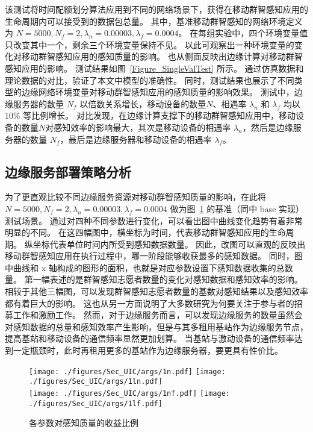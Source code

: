 该测试将时间配额划分算法应用到不同的网络场景下，获得在移动群智感知应用的生命周期内可以接受到的数据包总量。
其中，基准移动群智感知的网络环境定义为 $N=5000, N_f=2, \lambda_n = 0.00003, \lambda_f=0.0004$。
在每组实验中，四个环境变量值只改变其中一个，剩余三个环境变量保持不见。
以此可观察出一种环境变量的变化对移动群智感知应用的感知质量的影响。
也从侧面反映出边缘计算对移动群智感知应用的影响。
测试结果如图~\ref{Figure_SingleValTest} 所示。
通过仿真数据和理论数据的对比，验证了本文中模型的准确性。
同时，测试结果也展示了不同类型的边缘网络环境变量对移动群智感知应用的感知质量的影响效果。
测试中，边缘服务器的数量 $N_f$ 以倍数关系增长，移动设备的数量$N$、相遇率 $\lambda_n$ 和 $\lambda_f$ 均以 10\% 等比例增长。
对比发现，在边缘计算支撑下的移动群智感知应用中，移动设备的数量$N$对感知效率的影响最大，其次是移动设备的相遇率 $\lambda_n$，然后是边缘服务器的数量 $N_f$，最后是边缘服务器和移动设备的相遇率 $\lambda_f$。

\subsection{边缘服务部署策略分析}

为了更直观比较不同边缘服务资源对移动群智感知质量的影响，在此将 $N=5000, N_f=2, \lambda_n = 0.00003, \lambda_f=0.0004$ 做为图~\ref{Figure_SingleVal} 的基准（同中 base 实现）测试场景。
通过对四种不同参数进行变化，可以看出图中曲线变化趋势有着非常明显的不同。
在这四幅图中，横坐标为时间，代表移动群智感知应用的生命周期。
纵坐标代表单位时间内所受到感知数据数量。
因此，改图可以直观的反映出移动群智感知应用在执行过程中，哪一阶段能够收获最多的感知数据。
同时，图中曲线和 x 轴构成的图形的面积，也就是对应参数设置下感知数据收集的总数量。
第一幅表述的是群智感知志愿者数量的变化对感知数据和感知效率的影响。
相较于其他三幅图，可以发现群智感知志愿者数量的基数对感知结果以及感知效率都有着巨大的影响。
这也从另一方面说明了大多数研究为何要关注于参与者的招募工作和激励工作。
然而，对于边缘服务而言，可以发现边缘服务的数量虽然会对感知数据的总量和感知效率产生影响，但是与其多租用基站作为边缘服务节点，提高基站和移动设备的通信频率显然更加划算。
当基站与激动设备的通信频率达到一定瓶颈时，此时再租用更多的基站作为边缘服务器，要更具有性价比。

\begin{figure}[!h]
  \centering
	{\texttt{[image: ./figures/Sec\_UIC/args/1n.pdf]}}
	{\texttt{[image: ./figures/Sec\_UIC/args/1ln.pdf]}}\\
	{\texttt{[image: ./figures/Sec\_UIC/args/1nf.pdf]}}
	{\texttt{[image: ./figures/Sec\_UIC/args/1lf.pdf]}}
	\vspace{-1em}
	\caption{各参数对感知质量的收益比例}
	\label{Figure_SingleVal}
\end{figure}

